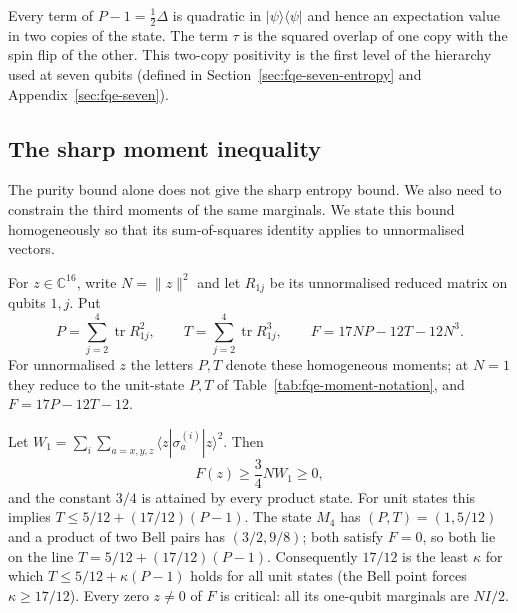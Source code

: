 \noindent Every term of $P-1=\tfrac12\Delta$ is quadratic in $|\psi\rangle\langle\psi|$ and hence an expectation value in two copies
of the state. The term $\tau$ is the squared overlap of one copy with the spin flip of the other. This two-copy positivity is the first
level of the hierarchy used at seven qubits (defined in Section~\ref{sec:fqe-seven-entropy} and
Appendix~\ref{sec:fqe-seven}).

\subsection{The sharp moment inequality}\label{sec:fqe-entropy_maximum-the-sharp-moment-inequality}

The purity bound alone does not give the sharp entropy bound. We also need to constrain the third
moments of the same marginals. We state this bound homogeneously so that its sum-of-squares identity
applies to unnormalised vectors.

For \(z\in\mathbb C^{16}\), write \(N=\|z\|^2\) and let \(R_{1j}\) be its unnormalised reduced matrix
on qubits \(1,j\). Put \[
P=\sum_{j=2}^4\operatorname{tr}R_{1j}^2,\qquad
T=\sum_{j=2}^4\operatorname{tr}R_{1j}^3,\qquad
F=17NP-12T-12N^3.
\]
For unnormalised \(z\) the letters \(P,T\) denote these homogeneous moments; at \(N=1\) they reduce to the unit-state
\(P,T\) of Table~\ref{tab:fqe-moment-notation}, and \(F=17P-12T-12\).

\begin{theorem}\label{thm:fqe-moment} Let
$W_1=\sum_i\sum_{a=x,y,z}\langle z|\sigma_a^{(i)}|z\rangle^2$. Then
\[
F(z)\ge\frac34NW_1\ge0,
\]
and the constant $3/4$ is attained by every product state.
For unit states this implies $T\le5/12+(17/12)(P-1)$. The state $M_4$ has $(P,T)=(1,5/12)$ and a
product of two Bell pairs has $(3/2,9/8)$; both satisfy $F=0$, so both lie on the line
$T=5/12+(17/12)(P-1)$. Consequently $17/12$ is the least $\kappa$ for which
$T\le5/12+\kappa(P-1)$ holds for all unit states (the Bell point forces $\kappa\ge17/12$).
Every zero $z\ne0$ of $F$ is critical: all its one-qubit marginals are $NI/2$.

\end{theorem}

